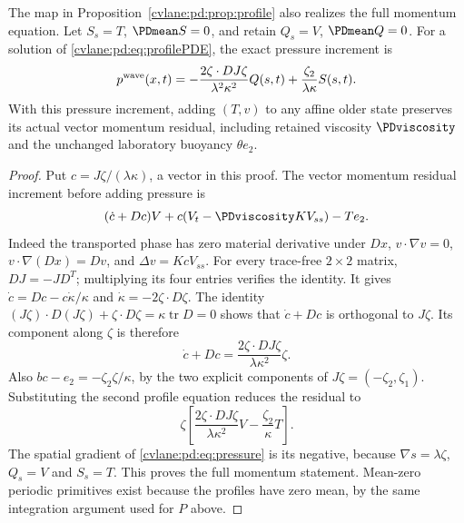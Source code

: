 \begin{cvlanepdproposition}\label{cvlane:pd:prop:pressure}
The map in Proposition~\ref{cvlane:pd:prop:profile} also realizes the full momentum
equation. Let $S_s=T$, $\PDmean S=0$, and retain $Q_s=V$, $\PDmean Q=0$.
For a solution of \eqref{cvlane:pd:eq:profilePDE}, the exact pressure increment is
\begin{equation}\label{cvlane:pd:eq:pressure}
 p^{\rm wave}(x,t)=
 -\frac{2\zeta\cdot D J\zeta}{\lambda^2\kappa^2}Q(s,t)
 +\frac{\zeta_2}{\lambda\kappa}S(s,t).
\end{equation}
With this pressure increment, adding $(T,v)$ to any affine older state
preserves its actual vector momentum residual, including retained
viscosity $\PDviscosity$ and the unchanged laboratory buoyancy $\theta e_2$.
\end{cvlanepdproposition}
\begin{proof}
Put $c=J\zeta/(\lambda\kappa)$, a vector in this proof. The vector
momentum residual increment before adding pressure is
\[
 (\dot c+Dc)V+c(V_t-\PDviscosity K V_{ss})-Te_2.
\]
Indeed the transported phase has zero material derivative under $Dx$,
$v\cdot\nabla v=0$, $v\cdot\nabla(Dx)=Dv$, and
$\Delta v=KcV_{ss}$.
For every trace-free $2\times2$ matrix,
$DJ=-JD^T$; multiplying its four entries verifies the identity.
It gives $\dot c=Dc-c\dot\kappa/\kappa$ and
$\dot\kappa=-2\zeta\cdot D\zeta$.
The identity
$(J\zeta)\cdot D(J\zeta)+\zeta\cdot D\zeta
=\kappa\operatorname{tr}D=0$ shows that $\dot c+Dc$ is orthogonal to
$J\zeta$. Its component along $\zeta$ is therefore
\[
 \dot c+Dc=\frac{2\zeta\cdot D J\zeta}{\lambda\kappa^2}\zeta.
\]
Also $bc-e_2=-\zeta_2\zeta/\kappa$, by the two explicit components of
$J\zeta=(-\zeta_2,\zeta_1)$. Substituting the second profile equation
reduces the residual to
\[
 \zeta\left[
 \frac{2\zeta\cdot D J\zeta}{\lambda\kappa^2}V
 -\frac{\zeta_2}{\kappa}T\right].
\]
The spatial gradient of \eqref{cvlane:pd:eq:pressure} is its negative, because
$\nabla s=\lambda\zeta$, $Q_s=V$ and $S_s=T$.
This proves the full momentum statement. Mean-zero periodic primitives
exist because the profiles have zero mean, by the same integration
argument used for $P$ above.
\end{proof}

